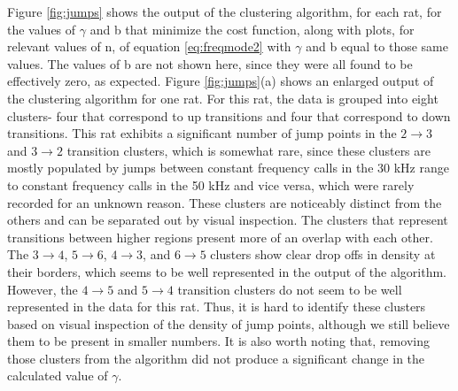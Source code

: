 \documentclass[twocolumn, prl]{revtex4}
\begin{document}
Figure \ref{fig:jumps} shows the output of the clustering algorithm, for each rat, for the values of $\gamma$ and b that minimize the cost function, along with plots, for relevant values of n, of equation \ref{eq:freqmode2} with $\gamma$ and b equal to those same values. The values of b are not shown here, since they were all found to be effectively zero, as expected. Figure \ref{fig:jumps}(a) shows an enlarged output of the clustering algorithm for one rat. For this rat, the data is grouped into eight clusters- four that correspond to up transitions and four that correspond to down transitions. This rat exhibits a significant number of jump points in the $2\rightarrow3$ and $3\rightarrow2$ transition clusters, which is somewhat rare, since these clusters are mostly populated by jumps between constant frequency calls in the 30 kHz range to constant frequency calls in the 50 kHz and vice versa, which were rarely recorded for an unknown reason. These clusters are noticeably distinct from the others and can be separated out by visual inspection. The clusters that represent transitions between higher regions present more of an overlap with each other. The $3\rightarrow4$, $5\rightarrow6$, $4\rightarrow3$, and $6\rightarrow5$ clusters show clear drop offs in density at their borders, which seems to be well represented in the output of the algorithm. However, the $4\rightarrow5$ and $5\rightarrow4$ transition clusters do not seem to be well represented in the data for this rat. Thus, it is hard to identify these clusters based on visual inspection of the density of jump points, although we still believe them to be present in smaller numbers. It is also worth noting that, removing those clusters from the algorithm did not produce a significant change in the calculated value of $\gamma$. 
\end{document}
